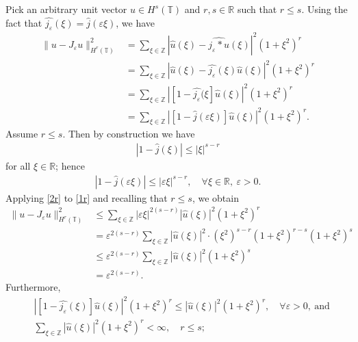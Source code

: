 \documentclass[12pt,reqno]{amsart}
\newcommand{\rr}{\mathbb{R}}
\newcommand{\zz}{\mathbb{Z}}
\newcommand{\ci}{\mathbb{T}}
\newcommand{\ee}{\varepsilon}
\theoremstyle{plain}  %
\theoremstyle{definition}
\begin{document}
Pick an arbitrary unit vector $u \in H^s(\ci)$ and
	$r, s \in \rr$ such that $r \le s$. Using the fact that
$\widehat{j_\ee}(\xi) = \widehat{j}(\ee \xi)$, we have
\begin{equation}
	\begin{split}
		\|u - J_\ee u\|_{H^r(\ci)}^2 
		& = \sum_{\xi \in \zz} |\widehat{u}(\xi) - \widehat{j_\ee * u}(\xi) |^2
		(1+\xi^2)^r
		\\
		& = \sum_{\xi \in \zz} |\widehat{u}(\xi) - \widehat{j_\ee}(\xi)
		\widehat{u}(\xi) |^2 (1+\xi^2)^r
		\\
		& = \sum_{\xi \in \zz} | [1- \widehat{j_\ee}(\xi] \widehat{u}(\xi) |^2
		(1+\xi^2)^r
		\\
		& = \sum_{\xi \in \zz} | [1- \widehat{j}(\ee \xi)] \widehat{u}(\xi) |^2
		(1+\xi^2)^r.
		\label{1r}
	\end{split}
\end{equation}
Assume $r \le s$. Then by construction we have
\begin{equation*}
	\begin{split}
		|1 - \widehat{j } (\xi) | \le |\xi|^{s-r}
	\end{split}
\end{equation*}
for all $\xi \in \rr$; hence
\begin{equation}
	\begin{split}
		|1 - \widehat{ j }(\ee \xi)| \le |\ee \xi |^{s-r}, \quad \forall
		\xi \in \rr, \ \ee > 0.
		\label{2r}
	\end{split}
\end{equation}
Applying \eqref{2r} to \eqref{1r} and recalling that $r \le s$, we obtain
\begin{equation}
	\label{2pr}
	\begin{split}
	\|u - J_\ee u\|_{H^r(\ci)}^2 
	& \le \sum_{\xi \in \zz}  |\ee \xi |^{2(s-r)}
	|\widehat{u}(\xi)|^2 (1 + \xi^2)^r
	\\
	& = \ee^{2(s-r)} \sum_{\xi \in \zz} |\widehat{u}(\xi)|^2  \cdot (\xi^2)^{s-r}
	(1 + \xi^2)^{r-s} (1 + \xi^2)^{s}
	\\
	& \le \ee^{2(s-r)}
	\sum_{\xi \in \zz} |\widehat{u}(\xi)|^2 (1 + \xi^2)^s
	\\
	& =  \ee^{2(s-r)}.
	\end{split}
\end{equation}
Furthermore,
\begin{equation*}
	\begin{split}
		& |[1- \widehat{j_\ee}(\xi)] \widehat{u}(\xi)|^2 (1 + \xi^2)^r \le
		|\widehat{u}(\xi)|^2 (1 + \xi^2)^r, \quad \forall \ee > 0, \ 
		\text{and}
		\\
		& \sum_{\xi \in \zz} |\widehat{u}(\xi)|^2 (1 + \xi^2)^r < \infty,
		\quad r \le s;
	\end{split}
\end{equation*}
\end{document}
